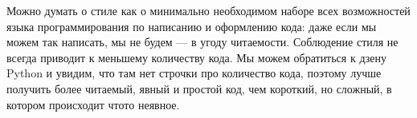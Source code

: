 \documentclass[letterpaper,10pt,russian]{sphinxmanual}
\begin{document}
\begin{sphinxVerbatim}[commandchars=\\\{\}]
   
           
             
           

  
           
             
           
           
\end{sphinxVerbatim}

\sphinxAtStartPar
Можно думать о стиле как о минимально необходимом наборе всех возможностей языка программирования по написанию и оформлению кода: даже если мы можем так написать, мы не будем — в угоду читаемости. Соблюдение стиля не всегда приводит к меньшему количеству кода. Мы можем обратиться к дзену Python и увидим, что там нет строчки про количество кода, поэтому лучше получить более читаемый, явный и простой код, чем короткий, но сложный, в котором происходит что\sphinxhyphen{}то неявное.
\end{document}
